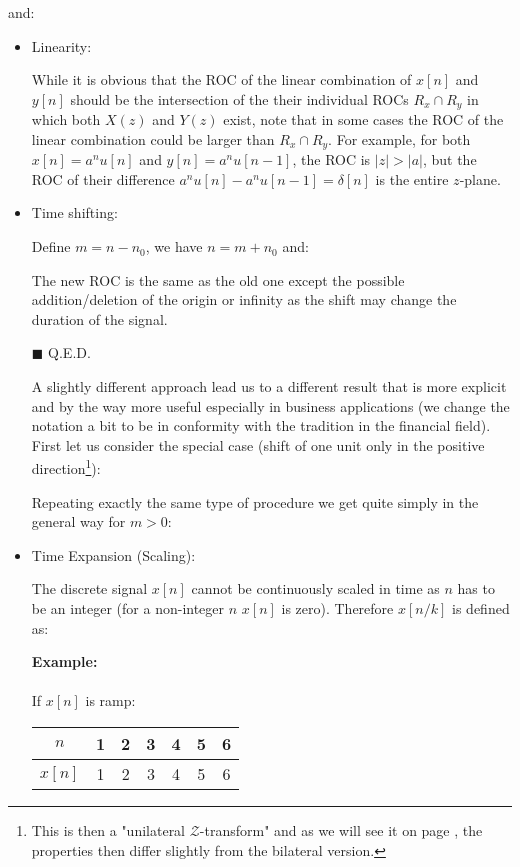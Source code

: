 	and:
	
	
	\begin{itemize}
		\item Linearity:
		
		While it is obvious that the ROC of the linear combination of $x[n]$ and $y[n]$ should be the intersection of the their individual ROCs $R_x \cap R_y$ in which both $X(z)$ and $Y(z)$ exist, note that in some cases the ROC of the linear combination could be larger than $R_x \cap R_y$. For example, for both $x[n]=a^n u[n]$ and $y[n]=a^n u[n-1]$, the ROC is $|z|>|a|$, but the ROC of their difference $a^n u[n]-a^n u[n-1]=\delta[n]$ is the entire $z$-plane.
		
		\item Time shifting:
		
		\begin{dem}
		
		Define $m=n-n_0$, we have $n=m+n_0$ and:
		
		The new ROC is the same as the old one except the possible addition/deletion of the origin or infinity as the shift may change the duration of the signal.
		\begin{flushright}
			$\blacksquare$  Q.E.D.
		\end{flushright}
		\end{dem}
		A slightly different approach lead us to a different result that is more explicit and by the way more useful especially in business applications (we change the notation a bit to be in conformity with the tradition in the financial field). First let us consider the special case (shift of one unit only in the positive direction\footnote{This is then a "unilateral $\mathcal{Z}$-transform" and as we will see it on page \pageref{unilateral z transform}, the properties then differ slightly from the bilateral version.}):
		
		Repeating exactly the same type of procedure we get quite simply in the general way for $m>0$:
		
		
		\item Time Expansion (Scaling):
		
		
		The discrete signal $x[n]$ cannot be continuously scaled in time as $n$ has to be an integer (for a non-integer $n$ $x[n]$ is zero). Therefore $x[n/k]$ is defined as:
		
		\begin{tcolorbox}[colframe=black,colback=white,sharp corners]
		\textbf{{\Large {}}Example:}\\\\
		If $x[n]$ is ramp:
		\begin{table}[H]
		\centering
		\begin{tabular}{c|cccccc} \hline
		 $n$ & 1 & 2 & 3 & 4 & 5 & 6 \\ \hline 
		 $x[n]$ & 1 & 2 & 3 & 4 & 5 & 6 \\ \hline 
		\end{tabular}
		\end{table}
		

\end{tcolorbox}
\end{itemize}
